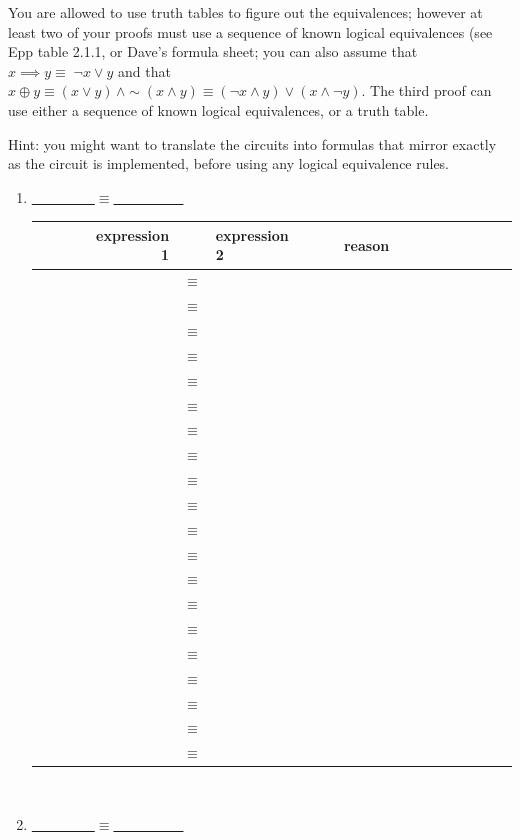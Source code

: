   You are  allowed to use truth  tables to figure  out the equivalences; however  at least
  two of your proofs must use a  sequence of known logical equivalences (see Epp table
  2.1.1, or Dave's formula sheet; you can also assume that $x \implies y \equiv \;
  {\lnot x  \vee y}$ and that  $x \oplus y  \equiv (x \lor  y)\, \land \sim\! (x  \land y)
  \equiv (\lnot  x \land y)  \lor (x \land  \lnot y)$. The third proof can use either a
  sequence of known logical equivalences, or a truth table.

  Hint: you might want to translate the  circuits into formulas that mirror exactly as the
  circuit is implemented, before using any logical equivalence rules.
  \newpage
\begin{enumerate}
\item \LARGE\underline{~~~~~~~~~}$\equiv$\underline{~~~~~~~~~~}\\

\begin{tabular}{rcl|l}
~~~~~~expression 1 & & expression 2~~~~~~ & reason \\
\hline
& $\equiv$ & & ~~~~~~~~~~~~~~~~~~~~~~~\\
\hline
& $\equiv$ & & ~~~~~~~~~~~~~~~~~~~~~~~\\
\hline
& $\equiv$ & & ~~~~~~~~~~~~~~~~~~~~~~~\\
\hline
& $\equiv$ & & ~~~~~~~~~~~~~~~~~~~~~~~\\
\hline
& $\equiv$ & & ~~~~~~~~~~~~~~~~~~~~~~~\\
\hline
& $\equiv$ & & ~~~~~~~~~~~~~~~~~~~~~~~\\
\hline
& $\equiv$ & & ~~~~~~~~~~~~~~~~~~~~~~~\\
\hline
& $\equiv$ & & ~~~~~~~~~~~~~~~~~~~~~~~\\
\hline
& $\equiv$ & & ~~~~~~~~~~~~~~~~~~~~~~~\\
\hline
& $\equiv$ & & ~~~~~~~~~~~~~~~~~~~~~~~\\
\hline
& $\equiv$ & & ~~~~~~~~~~~~~~~~~~~~~~~\\
\hline
& $\equiv$ & & ~~~~~~~~~~~~~~~~~~~~~~~\\
\hline
& $\equiv$ & & ~~~~~~~~~~~~~~~~~~~~~~~\\
\hline
& $\equiv$ & & ~~~~~~~~~~~~~~~~~~~~~~~\\
\hline
& $\equiv$ & & ~~~~~~~~~~~~~~~~~~~~~~~\\
\hline
& $\equiv$ & & ~~~~~~~~~~~~~~~~~~~~~~~\\
\hline
& $\equiv$ & & ~~~~~~~~~~~~~~~~~~~~~~~\\
\hline
& $\equiv$ & & ~~~~~~~~~~~~~~~~~~~~~~~\\
\hline
& $\equiv$ & & ~~~~~~~~~~~~~~~~~~~~~~~\\
\hline
& $\equiv$ & & ~~~~~~~~~~~~~~~~~~~~~~~\\
\hline
\end{tabular}\\
\large
\newpage
\item \LARGE\underline{~~~~~~~~~}$\equiv$\underline{~~~~~~~~~~}\\


\end{enumerate}
